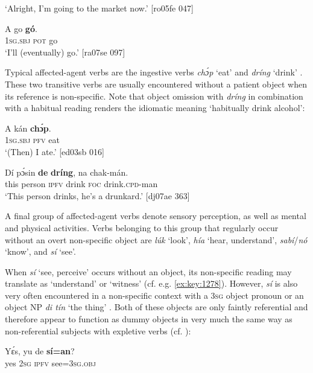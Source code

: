 \glt ‘Alright, I’m going to the market now.’ [ro05fe 047]
\z


\ea%
    \label{ex:key:1287}
    \gll A    go  \textbf{gó}.\\
\textsc{1sg.sbj}  \textsc{pot}  go\\

\glt ‘I’ll (eventually) go.’ [ra07se 097]
\z

Typical affected-agent verbs are the ingestive verbs \textit{chɔ́p}  ‘eat’ and \textit{dríng} ‘drink’ . These two transitive verbs are usually encountered without a patient object when its reference is non-specific. Note that object omission with \textit{dríng} in combination with a habitual reading renders the idiomatic meaning ‘habitually drink alcohol’:


\ea%
    \label{ex:key:1288}
    \gll A    kán  \textbf{chɔ́p}.\\
\textsc{1sg.sbj}  \textsc{pfv}  eat\\

\glt ‘(Then) I ate.’ [ed03sb 016]
\z


\ea%
    \label{ex:key:1289}
    \gll Dí  pɔ́sin  \textbf{de}  \textbf{dríng},  na  chak-mán.\\
this  person  \textsc{ipfv}  drink  \textsc{foc}  drink\textsc{.cpd}{}-man\\

\glt ‘This person drinks, he’s a drunkard.’ [dj07ae 363]
\z

A final group of affected-agent verbs denote sensory perception, as well as mental and physical activities. Verbs belonging to this group that regularly occur without an overt non-specific object are \textit{lúk} ‘look’, \textit{hía} ‘hear, understand’, \textit{sabí}/\textit{nó} ‘know’, and \textit{sí} ‘see’. 


When \textit{sí} ‘see, perceive’ occurs without an object, its non-specific reading may translate as ‘understand’ or ‘witness’ (cf. e.g. \ref{ex:key:1278}). However, \textit{sí} is also very often encountered in a non-specific context with a \textsc{3sg} object pronoun  or an object \textsc{NP} \textit{di tín} ‘the thing’ . Both of these objects are only faintly referential and therefore appear to function as dummy objects in very much the same way as non-referential subjects with expletive verbs (cf. ):



\ea%
    \label{ex:key:1290}
    \gll Yɛ́s,  yu  de  \textbf{sí=an}?\\
yes  \textsc{2sg}  \textsc{ipfv}  see=\textsc{3sg.obj}\\


